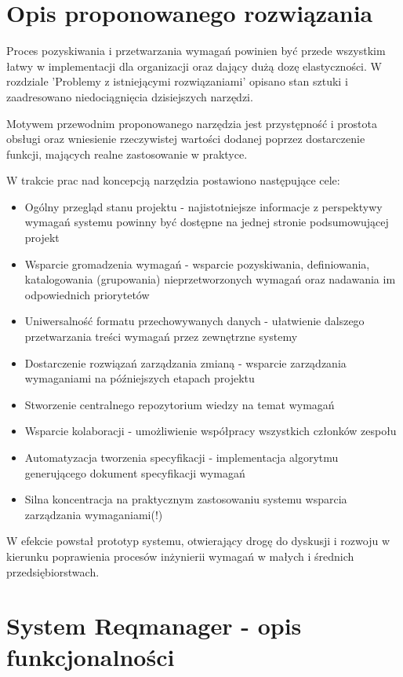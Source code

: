   \section{Opis proponowanego rozwiązania}

    Proces pozyskiwania i przetwarzania wymagań powinien być przede wszystkim łatwy w implementacji dla organizacji oraz dający dużą dozę elastyczności. W rozdziale 'Problemy z istniejącymi rozwiązaniami' opisano stan sztuki i zaadresowano niedociągnięcia dzisiejszych narzędzi. 

    Motywem przewodnim proponowanego narzędzia jest przystępność i prostota obsługi oraz wniesienie rzeczywistej wartości dodanej poprzez dostarczenie funkcji, mających realne zastosowanie w praktyce. 

    W trakcie prac nad koncepcją narzędzia postawiono następujące cele:
    
    \begin{itemize}
      \item Ogólny przegląd stanu projektu - najistotniejsze informacje z perspektywy wymagań systemu powinny być dostępne na jednej stronie podsumowującej projekt
      \item Wsparcie gromadzenia wymagań - wsparcie pozyskiwania, definiowania, katalogowania (grupowania) nieprzetworzonych wymagań oraz nadawania im odpowiednich priorytetów
      \item Uniwersalność formatu przechowywanych danych - ułatwienie dalszego przetwarzania treści wymagań przez zewnętrzne systemy
      \item Dostarczenie rozwiązań zarządzania zmianą - wsparcie zarządzania wymaganiami na późniejszych etapach projektu
      \item Stworzenie centralnego repozytorium wiedzy na temat wymagań
      \item Wsparcie kolaboracji - umożliwienie współpracy wszystkich członków zespołu
      \item Automatyzacja tworzenia specyfikacji - implementacja algorytmu generującego dokument specyfikacji wymagań 
      \item Silna koncentracja na praktycznym zastosowaniu systemu wsparcia zarządzania wymaganiami(!) 
    \end{itemize}

    W efekcie powstał prototyp systemu, otwierający drogę do dyskusji i rozwoju w kierunku poprawienia procesów inżynierii wymagań w małych i średnich przedsiębiorstwach. 

  \section{System Reqmanager - opis funkcjonalności}

